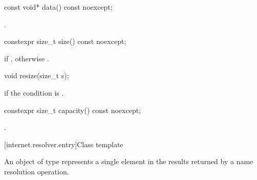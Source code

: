 \begin{itemdecl}
const void* data() const noexcept;
\end{itemdecl}

\begin{itemdescr}
\pnum
\returns {}.
\end{itemdescr}

\begin{itemdecl}
constexpr size_t size() const noexcept;
\end{itemdecl}

\begin{itemdescr}
\pnum
\returns {} if , otherwise .
\end{itemdescr}

\begin{itemdecl}
void resize(size_t s);
\end{itemdecl}

\begin{itemdescr}
\pnum
\remarks {} if the condition  \tcode{||}  is .
\end{itemdescr}

\begin{itemdecl}
constexpr size_t capacity() const noexcept;
\end{itemdecl}

\begin{itemdescr}
\pnum
\returns {}.
\end{itemdescr}




[internet.resolver.entry]{Class template }

\pnum
An object of type  represents a single element in the results returned by a name resolution operation.

